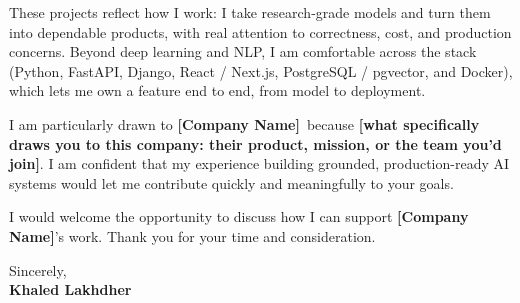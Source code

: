 \documentclass[11pt,a4paper]{article}
\newcommand{\FILL}[1]{{\bfseries\color{accent}#1}}
\newcommand{\Company}{\FILL{[Company Name]}}
\newcommand{\WhyCompany}{\FILL{[what specifically draws you to this company: their product, mission, or the team you'd join]}}
\begin{document}
These projects reflect how I work: I take research-grade models and turn them into dependable products, with real attention to correctness, cost, and production concerns. Beyond deep learning and NLP, I am comfortable across the stack (Python, FastAPI, Django, React / Next.js, PostgreSQL / pgvector, and Docker), which lets me own a feature end to end, from model to deployment.

I am particularly drawn to \Company\ because \WhyCompany. I am confident that my experience building grounded, production-ready AI systems would let me contribute quickly and meaningfully to your goals.

I would welcome the opportunity to discuss how I can support \Company's work. Thank you for your time and consideration.

\vspace{6pt}
Sincerely,\\[10pt]
\textbf{Khaled Lakhdher}
\end{document}
